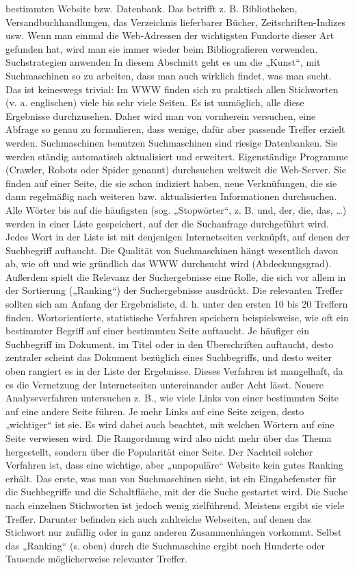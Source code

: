 \documentclass[]{book}
\theoremstyle{definition}
\theoremstyle{definition}
\theoremstyle{definition}
\theoremstyle{remark}
\begin{document}
bestimmten Website bzw. Datenbank. Das betrifft z. B. Bibliotheken,
Versandbuchhandlungen, das Verzeichnis lieferbarer Bücher,
Zeitschriften-Indizes usw. Wenn man einmal die Web-Adressen der
wichtigsten Fundorte dieser Art gefunden hat, wird man sie immer wieder
beim Bibliografieren verwenden. Suchstrategien anwenden In diesem
Abschnitt geht es um die „Kunst``, mit Suchmaschinen so zu arbeiten,
dass man auch wirklich findet, was man sucht. Das ist keineswegs
trivial: Im WWW finden sich zu praktisch allen Stichworten (v. a.
englischen) viele bis sehr viele Seiten. Es ist unmöglich, alle diese
Ergebnisse durchzusehen. Daher wird man von vornherein versuchen, eine
Abfrage so genau zu formulieren, dass wenige, dafür aber passende
Treffer erzielt werden. Suchmaschinen benutzen Suchmaschinen sind
riesige Datenbanken. Sie werden ständig automatisch aktualisiert und
erweitert. Eigenständige Programme (Crawler, Robots oder Spider genannt)
durchsuchen weltweit die Web-Server. Sie finden auf einer Seite, die sie
schon indiziert haben, neue Verknüfungen, die sie dann regelmäßig nach
weiteren bzw. aktualisierten Informationen durchsuchen. Alle Wörter bis
auf die häufigsten (sog. „Stopwörter``, z. B. und, der, die, das,
\ldots{}) werden in einer Liste gespeichert, auf der die Suchanfrage
durchgeführt wird. Jedes Wort in der Liste ist mit denjenigen
Internetseiten verknüpft, auf denen der Suchbegriff auftaucht. Die
Qualität von Suchmaschinen hängt wesentlich davon ab, wie oft und wie
gründlich das WWW durchsucht wird (Abdeckungsgrad). Außerdem spielt die
Relevanz der Suchergebnisse eine Rolle, die sich vor allem in der
Sortierung („Ranking``) der Suchergebnisse ausdrückt. Die relevanten
Treffer sollten sich am Anfang der Ergebnisliste, d. h. unter den ersten
10 bis 20 Treffern finden. Wortorientierte, statistische Verfahren
speichern beispielsweise, wie oft ein bestimmter Begriff auf einer
bestimmten Seite auftaucht. Je häufiger ein Suchbegriff im Dokument, im
Titel oder in den Überschriften auftaucht, desto zentraler scheint das
Dokument bezüglich eines Suchbegriffs, und desto weiter oben rangiert es
in der Liste der Ergebnisse. Dieses Verfahren ist mangelhaft, da es die
Vernetzung der Internetseiten untereinander außer Acht lässt. Neuere
Analyseverfahren untersuchen z. B., wie viele Links von einer bestimmten
Seite auf eine andere Seite führen. Je mehr Links auf eine Seite zeigen,
desto „wichtiger`` ist sie. Es wird dabei auch beachtet, mit welchen
Wörtern auf eine Seite verwiesen wird. Die Rangordnung wird also nicht
mehr über das Thema hergestellt, sondern über die Popularität einer
Seite. Der Nachteil solcher Verfahren ist, dass eine wichtige, aber
„unpopuläre`` Website kein gutes Ranking erhält. Das erste, was man von
Suchmaschinen sieht, ist ein Eingabefenster für die Suchbegriffe und die
Schaltfläche, mit der die Suche gestartet wird. Die Suche nach einzelnen
Stichworten ist jedoch wenig zielführend. Meistens ergibt sie viele
Treffer. Darunter befinden sich auch zahlreiche Webseiten, auf denen das
Stichwort nur zufällig oder in ganz anderen Zusammenhängen vorkommt.
Selbst das „Ranking`` (s. oben) durch die Suchmaschine ergibt noch
Hunderte oder Tausende möglicherweise relevanter Treffer.
\end{document}
